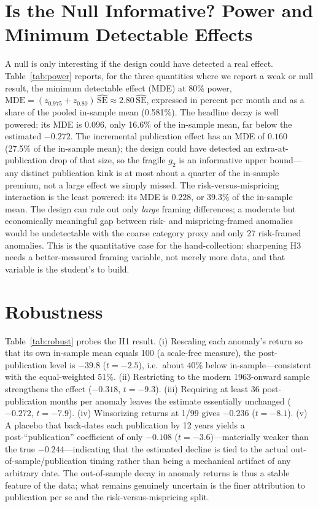 \documentclass[12pt]{article}
\begin{document}
\section{Is the Null Informative? Power and Minimum Detectable Effects}\label{sec:power}
A null is only interesting if the design could have detected a real effect. Table~\ref{tab:power}
reports, for the three quantities where we report a weak or null result, the minimum detectable
effect (MDE) at 80\% power, $\text{MDE}=(z_{0.975}+z_{0.80})\,\widehat{\text{SE}}\approx
2.80\,\widehat{\text{SE}}$, expressed in percent per month and as a share of the pooled
in-sample mean (0.581\%). The headline decay is well powered: its MDE is $0.096$, only 16.6\% of
the in-sample mean, far below the estimated $-0.272$. The incremental publication effect has an
MDE of $0.160$ (27.5\% of the in-sample mean); the design could have detected an
extra-at-publication drop of that size, so the fragile $g_2$ is an informative upper bound---any
distinct publication kink is at most about a quarter of the in-sample premium, not a large
effect we simply missed. The risk-versus-mispricing interaction is the least powered: its MDE is
$0.228$, or 39.3\% of the in-sample mean. The design can rule out only \emph{large} framing
differences; a moderate but economically meaningful gap between risk- and mispricing-framed
anomalies would be undetectable with the coarse category proxy and only 27 risk-framed
anomalies. This is the quantitative case for the hand-collection: sharpening H3 needs a
better-measured framing variable, not merely more data, and that variable is the student's to
build.

\section{Robustness}\label{sec:rob}
Table~\ref{tab:robust} probes the H1 result. (i) Rescaling each anomaly's return so that its
own in-sample mean equals 100 (a scale-free measure), the post-publication level is $-39.8$
($t=-2.5$), i.e.\ about 40\% below in-sample---consistent with the equal-weighted 51\%. (ii)
Restricting to the modern 1963-onward sample strengthens the effect ($-0.318$, $t=-9.3$).
(iii) Requiring at least 36 post-publication months per anomaly leaves the estimate essentially
unchanged ($-0.272$, $t=-7.9$). (iv) Winsorizing returns at 1/99 gives $-0.236$ ($t=-8.1$).
(v) A placebo that back-dates each publication by 12 years yields a post-``publication''
coefficient of only $-0.108$ ($t=-3.6$)---materially weaker than the true $-0.244$---indicating
that the estimated decline is tied to the actual out-of-sample/publication timing rather than
being a mechanical artifact of any arbitrary date. The out-of-sample decay in anomaly returns
is thus a stable feature of the data; what remains genuinely uncertain is the finer
attribution to publication per se and the risk-versus-mispricing split.
\end{document}
